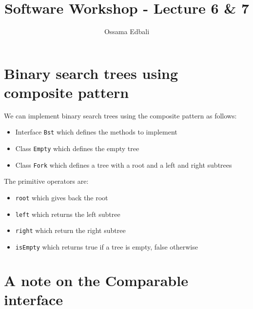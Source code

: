 \documentclass{article}
\title{Software Workshop - Lecture 6 \& 7}
\author{Ossama Edbali}
\begin{document}
	\maketitle
	
	\section*{Binary search trees using composite pattern}
	We can implement binary search trees using the composite pattern as follows:
	\begin{itemize}
		\item Interface \verb|Bst| which defines the methods to implement
		\item Class \verb|Empty| which defines the empty tree
		\item Class \verb|Fork| which defines a tree with a root and a left and right subtrees
	\end{itemize}
	
	The primitive operators are:
	\begin{itemize}
		\item \verb|root| which gives back the root
		\item \verb|left| which returns the left subtree
		\item \verb|right| which return the right subtree
		\item \verb|isEmpty| which returns true if a tree is empty, false otherwise
	\end{itemize}
	
	\section*{A note on the Comparable interface}	
	
\end{document}
